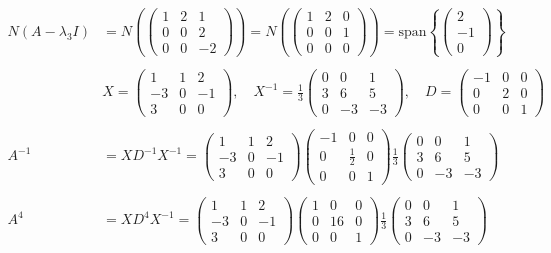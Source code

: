 \documentclass{article}
\begin{document}
\begin{align*}
    N(A - \lambda_3 I) &= N\left(\begin{pmatrix} 1 & 2 & 1 \\ 0 & 0 & 2 \\ 0 & 0 & -2 \end{pmatrix}\right) = N\left(\begin{pmatrix} 1 & 2 & 0 \\ 0 & 0 & 1 \\ 0 & 0 & 0 \end{pmatrix}\right)
    = \text{span}\left\{ \begin{pmatrix} 2 \\ -1 \\ 0 \end{pmatrix} \right\} \\
    \\
    &X = \begin{pmatrix} 1 & 1 & 2 \\ -3 & 0 & -1 \\ 3 & 0 & 0 \end{pmatrix} , \quad
    X^{-1} = \frac{1}{3} \begin{pmatrix} 0 & 0 & 1 \\ 3 & 6 & 5 \\ 0 & -3 & -3 \end{pmatrix} , \quad
    D = \begin{pmatrix} -1 & 0 & 0 \\ 0 & 2 & 0 \\ 0 & 0 & 1 \end{pmatrix} \\
    \\
    A^{-1} &= XD^{-1}X^{-1} = \begin{pmatrix} 1 & 1 & 2 \\ -3 & 0 & -1 \\ 3 & 0 & 0 \end{pmatrix} \begin{pmatrix} -1 & 0 & 0 \\ 0 & \frac{1}{2} & 0 \\ 0 & 0 & 1 \end{pmatrix} \frac{1}{3} \begin{pmatrix} 0 & 0 & 1 \\ 3 & 6 & 5 \\ 0 & -3 & -3 \end{pmatrix} \\
    \\
    A^4 &= XD^4X^{-1} = \begin{pmatrix} 1 & 1 & 2 \\ -3 & 0 & -1 \\ 3 & 0 & 0 \end{pmatrix} \begin{pmatrix} 1 & 0 & 0 \\ 0 & 16 & 0 \\ 0 & 0 & 1 \end{pmatrix} \frac{1}{3} \begin{pmatrix} 0 & 0 & 1 \\ 3 & 6 & 5 \\ 0 & -3 & -3 \end{pmatrix} \\

\end{align*}
\end{document}
